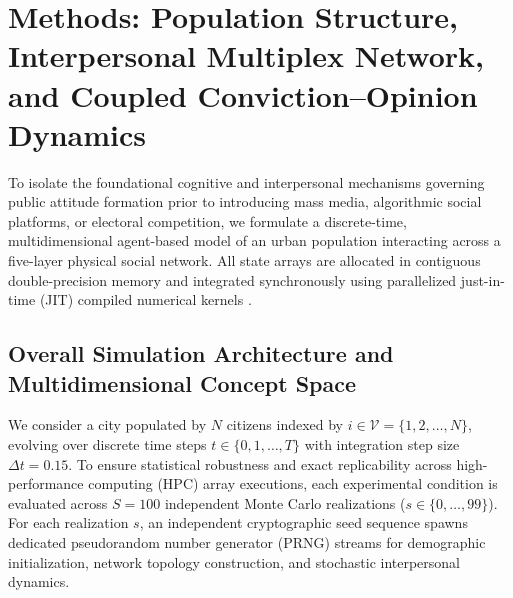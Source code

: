 
\section{Methods: Population Structure, Interpersonal Multiplex Network, and Coupled Conviction--Opinion Dynamics}
\label{sec:methods_baseline}

To isolate the foundational cognitive and interpersonal mechanisms governing public attitude formation prior to introducing mass media, algorithmic social platforms, or electoral competition, we formulate a discrete-time, multidimensional agent-based model of an urban population interacting across a five-layer physical social network. All state arrays are allocated in contiguous double-precision memory and integrated synchronously using parallelized just-in-time (JIT) compiled numerical kernels \citep{lam2015numba}.

\subsection{Overall Simulation Architecture and Multidimensional Concept Space}
\label{subsec:concept_space}

We consider a city populated by $N$ citizens indexed by $i \in \mathcal{V} = \{1, 2, \dots, N\}$, evolving over discrete time steps $t \in \{0, 1, \dots, T\}$ with integration step size $\Delta t = 0.15$. To ensure statistical robustness and exact replicability across high-performance computing (HPC) array executions, each experimental condition is evaluated across $S = 100$ independent Monte Carlo realizations ($s \in \{0, \dots, 99\}$). For each realization $s$, an independent cryptographic seed sequence spawns dedicated pseudorandom number generator (PRNG) streams for demographic initialization, network topology construction, and stochastic interpersonal dynamics.

